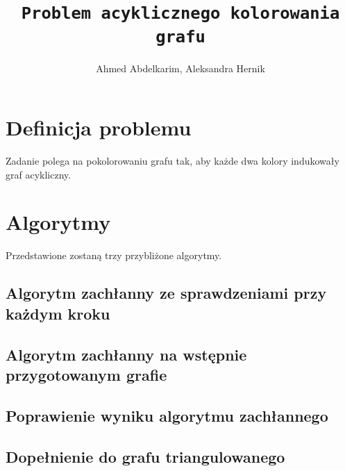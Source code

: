 \documentclass{article}
\title{\texttt{Problem acyklicznego kolorowania grafu}}
\author{Ahmed Abdelkarim, Aleksandra Hernik}
\begin{document}
\maketitle
\section{Definicja problemu}
Zadanie polega na pokolorowaniu grafu tak, aby każde dwa kolory indukowały graf acykliczny. 
\section{Algorytmy}
Przedstawione zostaną trzy przybliżone algorytmy.
\subsection{Algorytm zachłanny ze sprawdzeniami przy każdym kroku}

\subsection{Algorytm zachłanny na wstępnie przygotowanym grafie}

\subsection{Poprawienie wyniku algorytmu zachłannego}

\subsection{Dopełnienie do grafu triangulowanego}
\end{document}
